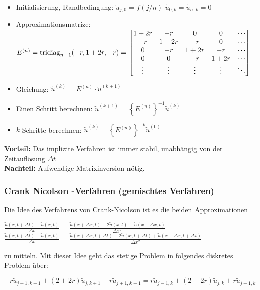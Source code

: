 \begin{itemize}
  \item Initialisierung, Randbedingung: $\tilde{u}_{j,0}=f(j/n)$ \qquad $\tilde{u}_{0,k}=\tilde{u}_{n,k}=0$
  \item Approximationsmatrize: $E^{(n)}=\operatorname{tridiag}_{n-1}(-r,1+2r,-r)=\begin{bmatrix}
            1+2r   & -r     & 0      & 0      & \cdots \\
            -r     & 1+2r   & -r     & 0      & \cdots \\
            0      & -r     & 1+2r   & -r     & \cdots \\
            0      & 0      & -r     & 1+2r   & \cdots \\
            \vdots & \vdots & \vdots & \vdots & \ddots
          \end{bmatrix}$
  \item Gleichung: $\tilde{u}^{(k)}=E^{(n)} \cdot \tilde{u}^{(k + 1)}$
  \item Einen Schritt berechnen: $\tilde{u}^{(k+1)}=\left\{E^{(n)}\right\}^{-1} \tilde{u}^{(k)}$
  \item $k$-Schritte berechnen: $\tilde{u}^{(k)}=\left\{E^{(n)}\right\}^{\bm{-}k} \tilde{u}^{(0)}$
\end{itemize}

\textbf{Vorteil:} Das implizite Verfahren ist immer stabil, unabhängig von der Zeitauflösung $\Delta t$\\
\textbf{Nachteil:} Aufwendige Matrixinversion nötig.

\subsubsection{Crank Nicolson -Verfahren (gemischtes Verfahren)}

Die Idee des Verfahrens von Crank-Nicolson ist es die beiden Approximationen

$\boxed{\frac{\tilde{u}(x,t+\Delta t) - \tilde{u}(x,t)}{\Delta t} =
    \frac{\tilde{u}(x+\Delta x, t)-2\tilde{u}(x,t) + \tilde{u}( x - \Delta x, t )} {\Delta x^2}}$\\
$\boxed{\frac{\tilde{u}(x,t+\Delta t) - \tilde{u}(x,t)}{\Delta t} =
    \frac{\tilde{u}(x+\Delta x, t+\Delta t)-2\tilde{u}(x,t+\Delta t) + \tilde{u}( x - \Delta x, t +\Delta t)} {\Delta x^2}}$

zu mitteln. Mit dieser Idee geht das stetige Problem in folgendes diskretes Problem über:

$-r \tilde{u}_{j-1,k+1} + (2+2r)\tilde{u}_{j,k+1} - r \tilde{u}_{j+1,k+1} = r
  \tilde{u}_{j-1,k} + (2-2r)\tilde{u}_{j,k} + r \tilde{u}_{j+1,k} $

